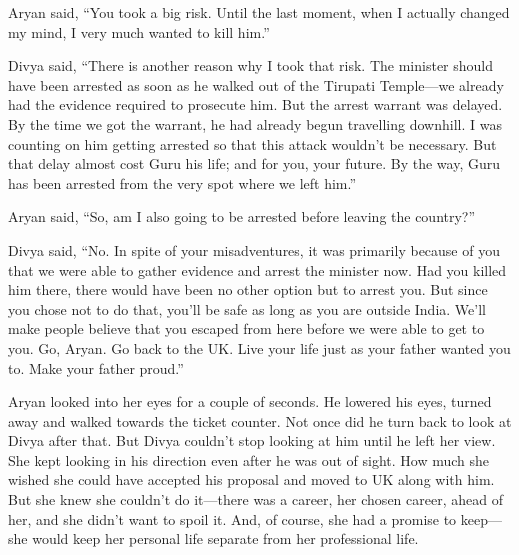 Aryan said, “You took a big risk. Until the last moment, when I actually changed
my mind, I very much wanted to kill him.”

Divya said, “There is another reason why I took that risk. The minister should
have been arrested as soon as he walked out of the Tirupati Temple—we already
had the evidence required to prosecute him. But the arrest warrant was delayed.
By the time we got the warrant, he had already begun travelling downhill. I was
counting on him getting arrested so that this attack wouldn't be necessary. But
that delay almost cost Guru his life; and for you, your future. By the way,
Guru has been arrested from the very spot where we left him.”

Aryan said, “So, am I also going to be arrested before leaving the country?”

Divya said, “No. In spite of your misadventures, it was primarily because of you
that we were able to gather evidence and arrest the minister now. Had you killed him
there, there would have been no other option but to arrest you. But since you
chose not
to do that, you'll be safe as long as you are outside India. We'll make people
believe that you escaped from here before we were able to get to you. Go, Aryan.
Go back to the UK. Live your life just as your father wanted you to. Make your
father proud.”

Aryan looked into her eyes for a couple of seconds. He lowered his eyes, turned
away and walked towards the ticket counter. Not once did he turn back to look at
Divya after that. But Divya couldn't stop looking at him until he left her view.
She kept looking in his direction even after he was out of sight. How much she
wished she could have accepted his proposal and moved to UK along with him. But
she knew she couldn't do it—there was a career, her chosen career, ahead of her,
and she didn't want to spoil it. And, of course, she had a promise to keep—she
would keep her personal life separate from her professional life.